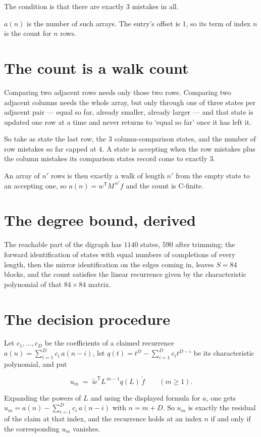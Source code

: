 \documentclass[11pt]{article}
\theoremstyle{definition}
\begin{document}
The condition is that there are exactly $3$ mistakes in all.

$a(n)$ is the number of such arrays. The entry's offset is 1, so its term of index $n$ is the count for $n$ rows.

\section{The count is a walk count}

Comparing two adjacent rows needs only those two rows. Comparing two adjacent columns needs the whole array, but only through one of three states per adjacent pair --- equal so far, already smaller, already larger --- and that state is updated one row at a time and never returns to `equal so far' once it has left it.

So take as state the last row, the $3$ column-comparison states, and the number of row mistakes so far capped at $4$. A state is accepting when the row mistakes plus the column mistakes its comparison states record come to exactly $3$.

An array of $n'$ rows is then exactly a walk of length $n'$ from the empty state to an accepting one, so $a(n) = w^{\mathsf T}M^{\,n'}f$ and the count is C-finite.

\section{The degree bound, derived}

The reachable part of the digraph has $1140$ states, $590$ after trimming; the forward identification of states with equal numbers of completions of every length, then the mirror identification on the edges coming in, leaves $S = 84$ blocks, and the count satisfies the linear recurrence given by the characteristic polynomial of that $84\times84$ matrix.

\section{The decision procedure}

Let $c_1,\dots,c_D$ be the coefficients of a claimed recurrence $a(n) = \sum_{i=1}^{D} c_i\,a(n-i)$, let $q(t) = t^{D} - \sum_{i=1}^{D} c_i t^{D-i}$ be its characteristic polynomial, and put

\[u_m \;=\; \tilde w^{\mathsf T} L^{\,m-1} q(L)\,\tilde f \qquad (m \ge 1).\]

Expanding the powers of $L$ and using the displayed formula for $a$, one gets $u_m = a(n) - \sum_{i=1}^{D} c_i\,a(n-i)$ with $n = m + D$. So $u_m$ is exactly the residual of the claim at that index, and the recurrence holds at an index $n$ if and only if the corresponding $u_m$ vanishes.
\end{document}

